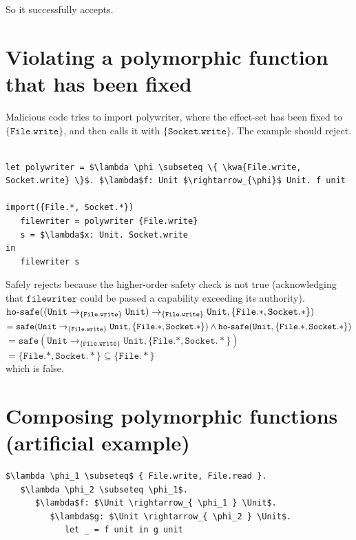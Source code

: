 \documentclass{llncs}
\newcommand{\keywadj}[1]{\mathtt{#1}}
\newcommand{\kwa}[1]{\keywadj{ #1 }}
\newcommand{\hyphen}{\hbox{-}}
\newcommand{\Unit}[0]{ \kwa{Unit} }
\newcommand{\safe}[2]{ \kwa{safe}(#1, #2) }
\newcommand{\hosafe}[2]{ \kwa{ho \hyphen safe}(#1, #2) }
\begin{document}
\noindent
So it successfully accepts.

\section{Violating a polymorphic function that has been fixed}

Malicious code tries to import polywriter, where the effect-set has been fixed to $\{ \kwa{File.write} \}$, and then calls it with $\kwa{ \{Socket.write\} }$. The example should reject.

\begin{lstlisting}

let polywriter = $\lambda \phi \subseteq \{ \kwa{File.write, Socket.write} \}$. $\lambda$f: Unit $\rightarrow_{\phi}$ Unit. f unit

import({File.*, Socket.*})
   filewriter = polywriter {File.write}
   s = $\lambda$x: Unit. Socket.write
in
   filewriter s
\end{lstlisting}

Safely rejects because the higher-order safety check is not true (acknowledging that $\kwa{filewriter}$ could be passed a capability exceeding its authority). \\

$\hosafe{(\Unit \rightarrow_{\kwa{\{File.write\}}} \Unit) \rightarrow_{\kwa{\{File.write\}}} \Unit}{\kwa{ \{File.*, Socket.*\} }}$ \\

$= \safe{\Unit \rightarrow_{\kwa{\{File.write\}}} \Unit}{\{\kwa{File.*, Socket.*}\}} \land \hosafe{\Unit}{\{\kwa{File.*, Socket.*}\}}$ \\

$= \safe{\Unit \rightarrow_{\kwa{\{File.write\}}} \Unit}{\{\kwa{File.*, Socket.*}\}}$ \\

$= \{\kwa{File.*, Socket.*}\} \subseteq \{ \kwa{File.*} \}$ \\

which is false.



\section{Composing polymorphic functions (artificial example)}

\begin{lstlisting}
$\lambda \phi_1 \subseteq$ { File.write, File.read }.
   $\lambda \phi_2 \subseteq \phi_1$.
      $\lambda$f: $\Unit \rightarrow_{ \phi_1 } \Unit$.
         $\lambda$g: $\Unit \rightarrow_{ \phi_2 } \Unit$.
            let _ = f unit in g unit 
\end{lstlisting}
\end{document}
